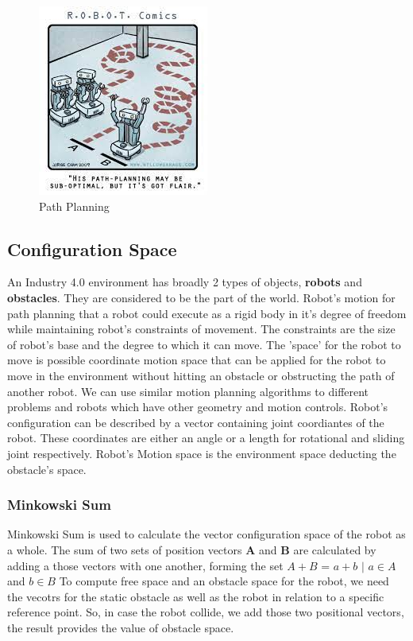 \begin{figure}[th]
    \centering
    \includegraphics[width=0.5\textwidth]{Figures/path-planning-comic.jpeg}
    \decoRule
    \caption[]{Path Planning}
    \label{fig:Path Planning Comic}
\end{figure}


\subsection{Configuration Space}
An Industry 4.0 environment has broadly 2 types of objects, \textbf{robots} and \textbf{obstacles}. They are considered to be the part of the world.
Robot's motion for path planning that a robot could execute as a rigid body in it's degree of freedom while maintaining robot's constraints of movement. The constraints are the size of robot's base and the degree to which it can move.
The 'space' for the robot to move is possible coordinate motion space that can be applied for the robot to move in the environment without hitting an obstacle or obstructing the path of another robot.
We can use similar motion planning algorithms to different problems and robots which have other geometry and motion controls. Robot's configuration can be described by a vector containing joint coordiantes of the robot. These coordinates are either an angle or a length for rotational and sliding joint respectively.
Robot's Motion space is the environment space deducting the obstacle's space. 

\subsubsection{Minkowski Sum}
Minkowski Sum is used to calculate the vector configuration space of the robot as a whole. The sum of two sets of position vectors \textbf{A} and \textbf{B} are calculated by adding a those vectors with one another, forming the set
$A + B$ = $a + b$ $|$  $a \in A$ and $b \in B$
To compute free space and an obstacle space for the robot, we need the vecotrs for the static obstacle as well as the robot in relation to a specific reference point. So, in case the robot collide, we add those two positional vectors, the result provides the value of obstacle space.

